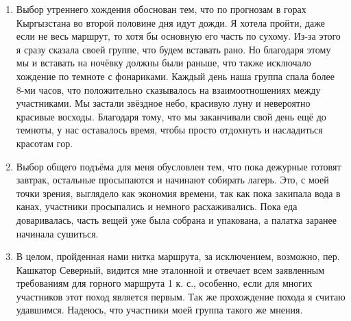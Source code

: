 \begin{enumerate}
		\item Выбор утреннего хождения обоснован тем, что по прогнозам в горах Кыргызстана во второй половине дня идут дожди. Я хотела пройти, даже если не весь маршрут, то хотя бы основную его часть по сухому. Из-за этого я сразу сказала своей группе, что будем вставать рано. Но благодаря этому мы и вставать на ночёвку должны были раньше, что также исключало хождение по темноте с фонариками. Каждый день наша группа спала более 8-ми часов, что положительно сказывалось на взаимоотношениях между участниками. Мы застали звёздное небо, красивую луну и невероятно красивые восходы. Благодаря тому, что мы заканчивали свой день ещё до темноты, у нас оставалось время, чтобы просто отдохнуть и насладиться красотам гор. 
		\item Выбор общего подъёма для меня обусловлен тем, что пока дежурные готовят завтрак, остальные просыпаются и начинают собирать лагерь. Это, с моей точки зрения, выглядело как экономия времени, так как пока закипала вода в канах, участники просыпались и немного расхаживались. Пока еда доваривалась, часть вещей уже была собрана и упакована, а палатка заранее начинала сушиться.
		\item В целом, пройденная нами нитка маршрута, за исключением, возможно, пер. Кашкатор Северный, видится мне эталонной и отвечает всем заявленным требованиям для горного маршрута 1 к. с., особенно, если для многих участников этот поход является первым. Так же прохождение похода я  считаю удавшимся. Надеюсь, что участники моей группа такого же мнения.
	\end{enumerate}
	\clearpage
